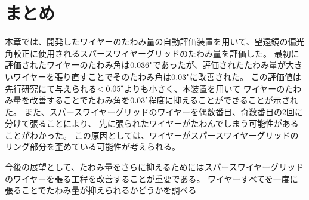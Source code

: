 \documentclass[../../main.tex]{subfiles}
\begin{document}
\section{まとめ}
本章では、開発したワイヤーのたわみ量の自動評価装置を用いて、望遠鏡の偏光角較正に使用されるスパースワイヤーグリッドのたわみ量を評価した。
最初に評価されたワイヤーのたわみ角は$0.036\tcdegree$であったが、評価されたたわみ量が大きいワイヤーを張り直すことでそのたわみ角は$0.03\tcdegree$に改善された。
この評価値は先行研究にて与えられる$<0.05\tcdegree$よりも小さく、本装置を用いて
ワイヤーのたわみ量を改善することでたわみ角を$0.03\tcdegree$程度に抑えることができることが示された。
また、スパースワイヤーグリッドのワイヤーを偶数番目、奇数番目の2回に分けて張ることにより、
先に張られたワイヤーがたわんでしまう可能性があることがわかった。
この原因としては、ワイヤーがスパースワイヤーグリッドのリング部分を歪めている可能性が考えられる。

今後の展望として、たわみ量をさらに抑えるためにはスパースワイヤーグリッドのワイヤーを張る工程を改善することが重要である。
ワイヤーすべてを一度に張ることでたわみ量が抑えられるかどうかを調べる
\end{document}
